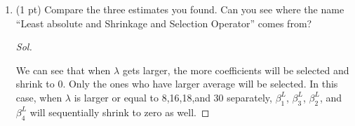 \documentclass[11pt, oneside]{article}   	%
\newenvironment{Solution}[1][Sol]{%
  \begin{proof}[#1]$ $\par\nobreak\ignorespaces
	\qquad
}{%
  \end{proof}
}
\begin{document}
\begin{enumerate}[resume*]
\begin{Solution}
		      \begin{center}
		      \end{center}

	      \end{Solution}



	\item (1 pt) Compare the three estimates you found. Can you see where
	      the name ``Least absolute and Shrinkage and Selection Operator''
	      comes from?
	      \begin{Solution}
We can see that when $\lambda$ gets larger, the more coefficients will be selected and shrink to 0. Only the ones who have larger average will be selected. In this case, when $\lambda$ is larger or equal to 8,16,18,and 30 separately, $\beta_1^L$, $\beta_3^L$, $\beta_2^L$, and $\beta_4^L$ will sequentially shrink to zero as well.
	      \end{Solution}
\end{enumerate}

\newpage
\end{document}
